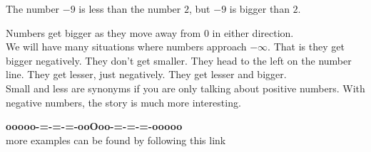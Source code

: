 \documentclass{ximera}
\begin{document}
\begin{example}


The number $-9$ is less than the number $2$, but $-9$ is bigger than $2$.



\end{example}






Numbers get bigger as they move away from $0$ in either direction. \\




We will have many situations where numbers approach $-\infty$.  That is they get bigger negatively.  They don't get smaller.  They head to the left on the number line. They get lesser, just negatively.  They get lesser and bigger. \\



Small and less are synonyms if you are only talking about positive numbers. With negative numbers, the story is much more interesting.











\begin{onlineOnly}
\begin{center}
\textbf{\textcolor{green!50!black}{ooooo-=-=-=-ooOoo-=-=-=-ooooo}} \\

more examples can be found by following this link\\ 

\end{center}
\end{onlineOnly}
\end{document}
